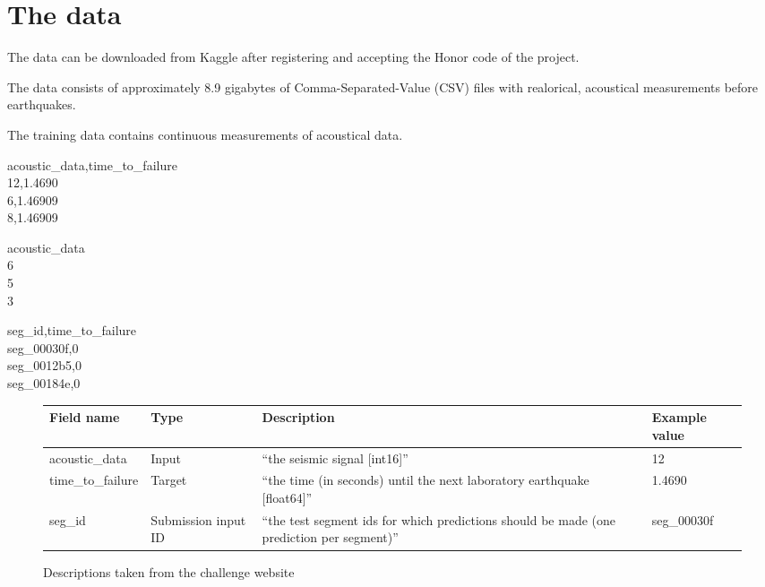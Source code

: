 \documentclass[colorback,accentcolor=tud9c,12pt]{tudreport}
\begin{document}
	\section{The data}
	The data can be downloaded from Kaggle after registering and accepting the Honor code of the project.
	
	The data consists of approximately 8.9 gigabytes of Comma-Separated-Value (CSV) files with realorical, acoustical measurements before earthquakes.
	
	The training data contains continuous measurements of acoustical data.
	
	\vspace{8mm}
	
	\begin{minipage}[b]{0.33333\textwidth}
		acoustic\_data,time\_to\_failure\\
		12,1.4690\\
		6,1.46909\\
		8,1.46909
		\label{fig:data_train}
	\end{minipage}%
	\begin{minipage}[b]{0.33333\textwidth}
		acoustic\_data\\
		6\\
		5\\
		3
	\end{minipage}%
	\begin{minipage}[b]{0.33333\textwidth}
		seg\_id,time\_to\_failure\\
		seg\_00030f,0\\
		seg\_0012b5,0\\
		seg\_00184e,0
	\end{minipage}%

	\vspace{8mm}
	
	
	\begin{figure}[htp]
		\begin{tabularx}{\textwidth}{ L{8}|L{5}|L{12}|L{7} }
			Field name & Type & Description & Example value \\
			\hline 
			acoustic\_data & Input & ``the seismic signal [int16]'' & 12 \\
			\hline 
			time\_to\_failure & Target & ``the time (in seconds) until the next laboratory earthquake [float64]''  & 1.4690 \\
			\hline 
			seg\_id & Submission input ID & ``the test segment ids for which predictions should be made (one prediction per segment)'' & seg\_00030f \\
		\end{tabularx}
		\caption{Descriptions taken from the challenge website}
	\end{figure}
	
\end{document}
